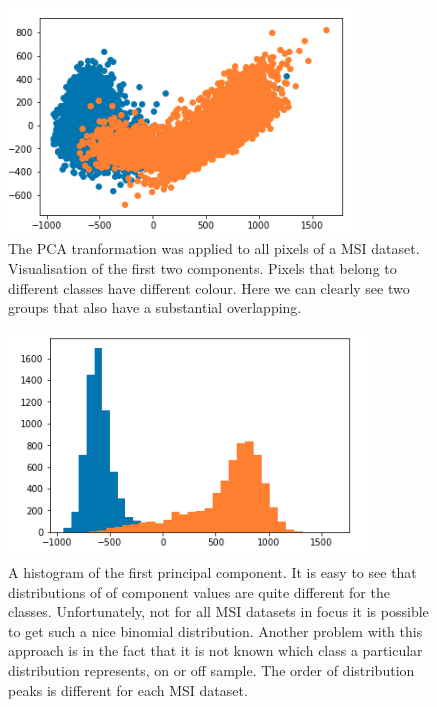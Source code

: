 \documentclass[a4paper]{article}
\begin{document}
    \begin{figure}[H]
        \centering
            \includegraphics[width=\textwidth,height=6cm,keepaspectratio]{pca_2d_plot.png}
        \caption{The PCA tranformation was applied to all pixels of a MSI dataset.
        Visualisation of the first two components.
        Pixels that belong to different classes have different colour. Here we can clearly see two groups that also have a substantial overlapping.}
    \end{figure}
    
    \begin{figure}[H]
        \centering
            \includegraphics[width=\textwidth,height=6cm,keepaspectratio]{pca_1d_plot.png}
        \caption{A histogram of the first principal component. It is easy to see that distributions of of component values are
        quite different for the classes. Unfortunately, not for all MSI datasets in focus it is possible to get such
        a nice binomial distribution. Another problem with this approach is in the fact that it is not known which 
        class a particular distribution represents, on or off sample. The order of distribution peaks is different for
        each MSI dataset.}
    \end{figure}
    
\end{document}
